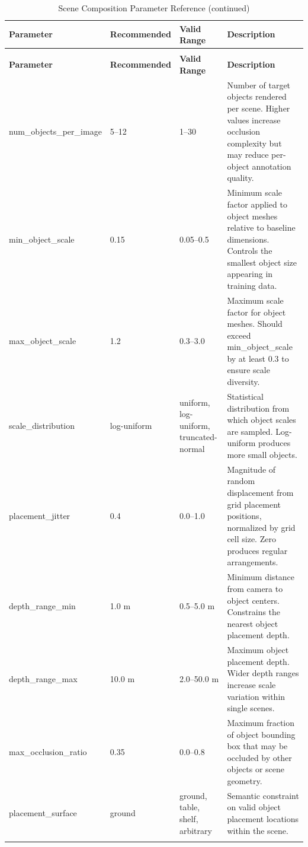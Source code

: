 \begin{longtable}{p{3.5cm}p{2cm}p{2.5cm}p{5.5cm}}
\caption{Scene Composition Parameter Reference} \label{tab:scene_composition} \\
\toprule
\textbf{Parameter} & \textbf{Recommended} & \textbf{Valid Range} & \textbf{Description} \\
\midrule
\endfirsthead
\caption[]{Scene Composition Parameter Reference (continued)} \\
\toprule
\textbf{Parameter} & \textbf{Recommended} & \textbf{Valid Range} & \textbf{Description} \\
\midrule
\endhead
\bottomrule
\endfoot
\bottomrule
\endlastfoot
num\_objects\_per\_image & 5--12 & 1--30 & Number of target objects rendered per scene. Higher values increase occlusion complexity but may reduce per-object annotation quality. \\
\addlinespace
min\_object\_scale & 0.15 & 0.05--0.5 & Minimum scale factor applied to object meshes relative to baseline dimensions. Controls the smallest object size appearing in training data. \\
\addlinespace
max\_object\_scale & 1.2 & 0.3--3.0 & Maximum scale factor for object meshes. Should exceed min\_object\_scale by at least 0.3 to ensure scale diversity. \\
\addlinespace
scale\_distribution & log-uniform & uniform, log-uniform, truncated-normal & Statistical distribution from which object scales are sampled. Log-uniform produces more small objects. \\
\addlinespace
placement\_jitter & 0.4 & 0.0--1.0 & Magnitude of random displacement from grid placement positions, normalized by grid cell size. Zero produces regular arrangements. \\
\addlinespace
depth\_range\_min & 1.0 m & 0.5--5.0 m & Minimum distance from camera to object centers. Constrains the nearest object placement depth. \\
\addlinespace
depth\_range\_max & 10.0 m & 2.0--50.0 m & Maximum object placement depth. Wider depth ranges increase scale variation within single scenes. \\
\addlinespace
max\_occlusion\_ratio & 0.35 & 0.0--0.8 & Maximum fraction of object bounding box that may be occluded by other objects or scene geometry. \\
\addlinespace
placement\_surface & ground & ground, table, shelf, arbitrary & Semantic constraint on valid object placement locations within the scene. \\
\addlinespace

\end{longtable}
